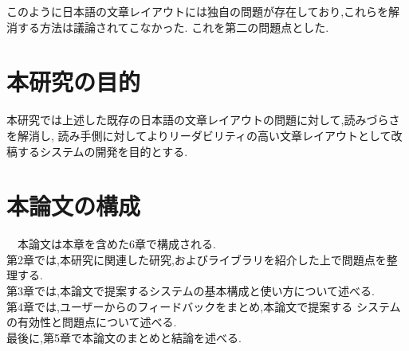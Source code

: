 このように日本語の文章レイアウトには独自の問題が存在しており,これらを解消する方法は議論されてこなかった.
これを第二の問題点とした.

\section{本研究の目的}
本研究では上述した既存の日本語の文章レイアウトの問題に対して,読みづらさを解消し,
読み手側に対してよりリーダビリティの高い文章レイアウトとして改稿するシステムの開発を目的とする.

\section{本論文の構成}
 本論⽂は本章を含めた6章で構成される.
 \\第2章では,本研究に関連した研究,およびライブラリを紹介した上で問題点を整理する.
 \\第3章では,本論⽂で提案するシステムの基本構成と使い⽅について述べる.
 \\第4章では,ユーザーからのフィードバックをまとめ,本論⽂で提案する
システムの有効性と問題点について述べる.
 \\最後に,第5章で本論⽂のまとめと結論を述べる.